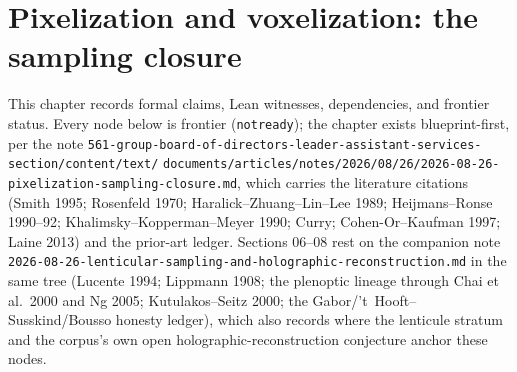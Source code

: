 \chapter{Pixelization and voxelization: the sampling closure}\label{ch:pixelization}

This chapter records formal claims, Lean witnesses, dependencies, and frontier status.
Every node below is frontier (\texttt{notready}); the chapter exists blueprint-first, per
the note
\texttt{561-group-board-of-directors-leader-assistant-services-section/content/text/}
\texttt{documents/articles/notes/2026/08/26/2026-08-26-pixelization-sampling-closure.md},
which carries the literature citations (Smith 1995; Rosenfeld 1970; Haralick--Zhuang--Lin--Lee
1989; Heijmans--Ronse 1990--92; Khalimsky--Kopperman--Meyer 1990; Curry; Cohen-Or--Kaufman
1997; Laine 2013) and the prior-art ledger. Sections 06--08 rest on the companion note
\texttt{2026-08-26-lenticular-sampling-and-holographic-reconstruction.md} in the same
tree (Lucente 1994; Lippmann 1908; the plenoptic lineage through Chai et al.\ 2000 and Ng
2005; Kutulakos--Seitz 2000; the Gabor/'t~Hooft--Susskind/Bousso honesty ledger), which
also records where the lenticule stratum and the corpus's own open
holographic-reconstruction conjecture anchor these nodes.











